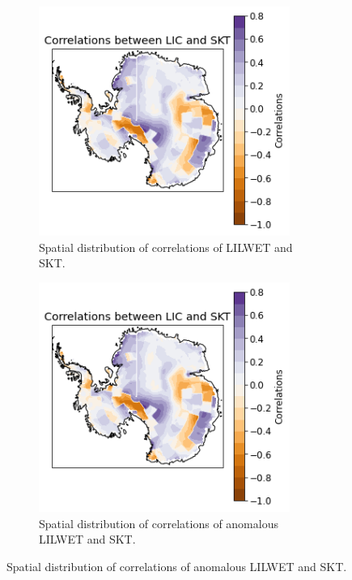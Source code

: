 \documentclass[../main.tex]{subfiles}
\begin{document}
\begin{figure}[H]
\centering
\begin{subfigure}[h!]{0.49\textwidth}
\centering
\includegraphics[width=0.9\textwidth]{images/week8/lres/corr_lic_skt_shortterm_spatial}
\caption{Spatial distribution of correlations of LILWET and SKT.}
\end{subfigure}
\begin{subfigure}[h!]{0.49\textwidth}
\centering
\includegraphics[width=0.9\textwidth]{images/week8/lres/corr_lic_skt_shortterm_spatial_anmomalous}
\caption{Spatial distribution of correlations of anomalous LILWET and SKT.}

\end{subfigure}
\end{figure}
\end{document}
